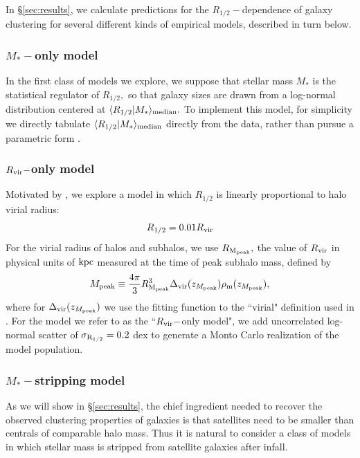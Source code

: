\documentclass[usenatbib,usegraphicx,letterpaper]{mn2e}
\newcommand{\beq}{\begin{equation}}
\newcommand{\eeq}{\end{equation}}
\newcommand{\rhalf}{R_{1/2}}
\newcommand{\sigmarhalf}{\sigma_{\rm R_{1/2}}}
\newcommand{\mstar}{M_{\ast}}
\newcommand{\mpeak}{M_{\rm peak}}
\newcommand{\zpeak}{z_{M_{\rm peak}}}
\newcommand{\rvir}{R_{\rm vir}}
\newcommand{\rmpeak}{R_{\rm M_{peak}}}
\newcommand{\median}[2]{\langle{#1}\vert{#2}\rangle_{\rm median}}
\newcommand{\kpc}{{\rm kpc}}
\begin{document}
In \S\ref{sec:results}, we calculate predictions for the $\rhalf-$dependence of galaxy clustering for several different kinds of empirical models, described in turn below.


\subsubsection{$\mstar-$only model}
\label{subsubsec:mstaronlymodel}

In the first class of models we explore, we suppose that stellar mass $\mstar$ is the statistical regulator of $\rhalf,$ so that galaxy sizes are drawn from a log-normal distribution centered at $\median{\rhalf}{\mstar}.$ To implement this model, for simplicity we directly tabulate $\median{\rhalf}{\mstar}$ directly from the data, rather than pursue a parametric form \citep[see, e.g.,][]{zhang_yang17}.

\subsubsection{$\rvir-$only model}
\label{subsubsec:rvirmodel}

Motivated by \citet{kravtsov13}, we explore a model in which $\rhalf$ is linearly proportional to halo virial radius:
\beq
\label{eq:fiducial_model}
\rhalf = 0.01\rvir
\eeq
For the virial radius of halos and subhalos, we use $\rmpeak,$ the value of $\rvir$ in physical units of $\kpc$ measured at the time of peak subhalo mass, defined by
\beq
\mpeak\equiv\frac{4\pi}{3}\rmpeak^{3}\Delta_{\rm vir}(\zpeak)\rho_{\rm m}(\zpeak),
\eeq
where for $\Delta_{\rm vir}(\zpeak)$ we use the fitting function to the ``virial" definition used in \citet{bryan_norman98}. For the model we refer to as the ``$\rvir-$only model", we add uncorrelated log-normal scatter of $\sigmarhalf=0.2$ dex to generate a Monto Carlo realization of the model population.

\subsubsection{$\mstar-$stripping model}
\label{subsubsec:strippingmodel}

As we will show in \S\ref{sec:results}, the chief ingredient needed to recover the observed clustering properties of galaxies is that satellites need to be smaller than centrals of comparable halo mass. Thus it is natural to consider a class of models in which stellar mass is stripped from satellite galaxies after infall.
\end{document}
